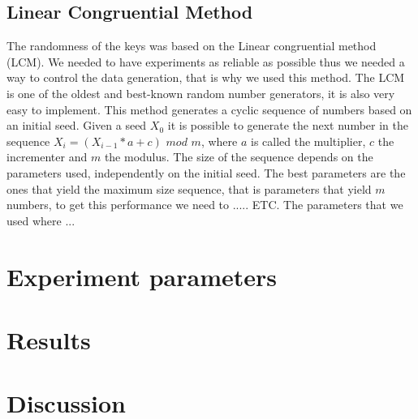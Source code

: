 \documentclass{article}
\begin{document}
		\subsection*{Linear Congruential Method}
		The randomness of the keys was based on the Linear congruential method (LCM). We needed to have experiments as reliable as possible thus we needed a way to control the data generation, that is why we used this method. The LCM is one of the oldest and best-known random number generators, it is also very easy to implement. This method generates a cyclic sequence of numbers based on an initial seed. Given a seed $X_0$ it is possible to generate the next number in the sequence $X_i = (X_{i-1} * a + c)$ $mod$ $m$, where $a$ is called the multiplier, $c$ the incrementer and $m$ the modulus. The size of the sequence depends on the parameters used, independently on the initial seed. The best parameters are the ones that yield the maximum size sequence, that is parameters that yield $m$ numbers, to get this performance we need to ..... ETC.  The parameters that we used where ...
    \section{Experiment parameters}
        \lipsum[1]
    \section{Results}

    \section{Discussion}
        \lipsum[1]


    \printbibliography
\end{document}
